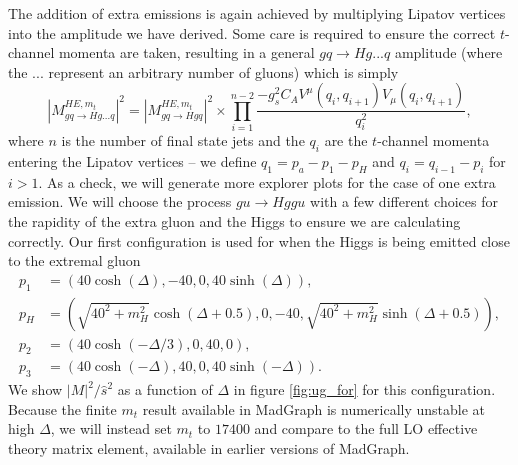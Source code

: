 The addition of extra emissions is again achieved by multiplying Lipatov vertices into the amplitude we have derived. Some care is required to ensure the correct $t$-channel momenta are taken, resulting in a general $gq\to Hg...q$ amplitude (where the ... represent an arbitrary number of gluons) which is simply
\begin{equation}
|M_{gq \to Hg...q}^{HE,m_t}|^2 = |M_{gq \to Hgq}^{HE,m_t}|^2 \times \prod_{i=1}^{n-2} \frac{-g_s^2C_A V^\mu(q_i, q_{i+1}) V_\mu(q_i, q_{i+1})}{q_i^2},
\end{equation}
where $n$ is the number of final state jets and the $q_i$ are the $t$-channel momenta entering the Lipatov vertices -- we define $q_1 = p_a - p_1 -p_H$ and $q_i = q_{i-1} - p_i$ for $i >1$. As a check, we will generate more explorer plots for the case of one extra emission. We will choose the process $gu \to Hggu$ with a few different choices for the rapidity of the extra gluon and the Higgs to ensure we are calculating correctly. Our first configuration is used for when the Higgs is being emitted close to the extremal gluon
\begin{subequations}
\begin{align}
p_1 &= (40 \cosh(\Delta),-40,0,40 \sinh(\Delta)), \\
p_H &= (\sqrt{40^2+m_H^2} \cosh(\Delta+0.5), 0,-40,\sqrt{40^2+m_H^2}  \sinh(\Delta+0.5)), \\
p_2 &= (40 \cosh(-\Delta/3),0,40,0), \\
p_3 &= (40 \cosh(-\Delta),40,0,40 \sinh(-\Delta)).
\end{align}
\end{subequations}
We show $|M|^2/\hat{s}^2$ as a function of $\Delta$ in figure \ref{fig:ug_for} for this configuration. Because the finite $m_t$ result available in MadGraph is numerically unstable at high $\Delta$, we will instead set $m_t$ to $17400$ and compare to the full LO effective theory matrix element, available in earlier versions of MadGraph. 

